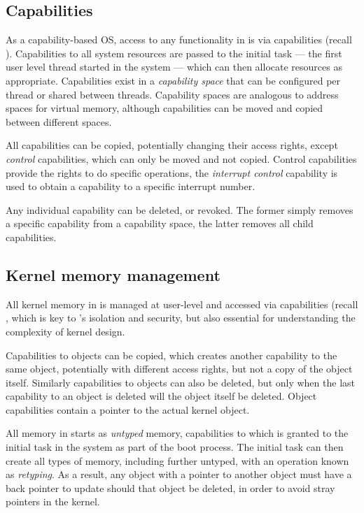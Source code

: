 \subsection{Capabilities}
\label{s:capabilities}

As a capability-based \gls{OS}, access to any functionality in \selfour is via capabilities (recall
). Capabilities to all system resources are passed to the initial task --- the first
user level thread started in the system --- which can then allocate resources as appropriate.
Capabilities exist in a \emph{capability space} that can be configured per thread or shared between
threads. Capability spaces are analogous to address spaces for virtual memory, although
capabilities can be moved and copied between different spaces. 

All capabilities can be copied, potentially changing their access rights, except \emph{control}
capabilities, which can only be moved and not copied. Control capabilities provide the rights to do
specific operations, \eg the \emph{interrupt control} capability is used to obtain a capability
to a specific interrupt number.

Any individual capability can be deleted, or revoked. The former simply removes a specific
capability from a capability space, the latter removes all child capabilities.


\subsection{Kernel memory management}

All kernel memory in \selfour is managed at user-level and accessed via capabilities (recall
, which is key to \selfour's isolation and security, but also essential for
understanding the complexity of kernel design.

Capabilities to objects can be copied, which creates another capability to the same object,
potentially with different access rights, but not
a copy of the object itself. 
Similarly capabilities to objects can also be deleted, but only when the last capability to an
object is deleted will the object itself be deleted. Object capabilities contain a pointer to the
actual kernel object. 

All memory in \selfour starts as \emph{untyped} memory, capabilities to which is granted to the
initial task in the system as part of the boot process. The initial task can then create all
types of memory, including further untyped, with an operation known as \emph{retyping}. As a result,
any object with a pointer to another object must have a back pointer to update should that object be
deleted, in order to avoid stray pointers in the kernel. 

